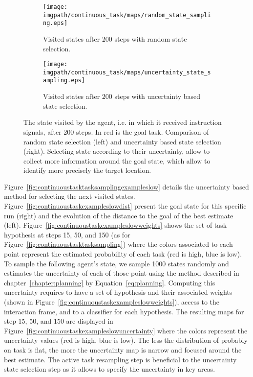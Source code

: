 
\begin{figure}[!htbp]
\centering
    \begin{subfigure}[t]{0.49\columnwidth}
        \centering
        \texttt{[image: \\imgpath/continuous\_task/maps/random\_state\_sampling.eps]}
        \caption{Visited states after 200 steps with random state selection.}
        \label{fig:continuousstaterandomstates}
    \end{subfigure}
    \begin{subfigure}[t]{0.49\columnwidth}
        \centering
        \texttt{[image: \\imgpath/continuous\_task/maps/uncertainty\_state\_sampling.eps]}
        \caption{Visited states after 200 steps with uncertainty based state selection.}
        \label{fig:continuousstateuncertaintystates}
    \end{subfigure}
\caption{The state visited by the agent, i.e. in which it received instruction signals, after 200 steps. In red is the goal task. Comparison of random state selection (left) and uncertainty based state selection (right). Selecting state according to their uncertainty, allow to collect more information around the goal state, which allow to identify more precisely the target location.}
\label{fig:continuoustaskstatesampling}
\end{figure}

Figure~\ref{fig:continuoustasktasksamplingexampleslow} details the uncertainty based method for selecting the next visited states. Figure~\ref{fig:continuoustaskexampleslowdist} present the goal state for this specific run (right) and the evolution of the distance to the goal of the best estimate (left). Figure~\ref{fig:continuoustaskexampleslowweights} shows the set of task hypothesis at steps 15, 50, and 150 (as for Figure~\ref{fig:continuoustasktasksampling}) where the colors associated to each point represent the estimated probability of each task (red is high, blue is low). To sample the following agent's state, we sample 1000 states randomly and estimates the uncertainty of each of those point using the method described in chapter~\ref{chapter:planning} by Equation~\ref{eq:planning}. Computing this uncertainty requires to have a set of hypothesis and their associated weights (shown in Figure~\ref{fig:continuoustaskexampleslowweights}), access to the interaction frame, and to a classifier for each hypothesis. The resulting maps for step 15, 50, and 150 are displayed in Figure~\ref{fig:continuoustaskexampleslowuncertainty} where the colors represent the uncertainty values (red is high, blue is low). The less the distribution of probably on task is flat, the more the uncertainty map is narrow and focused around the best estimate. The active task resampling step is beneficial to the uncertainty state selection step as it allows to specify the uncertainty in key areas.

